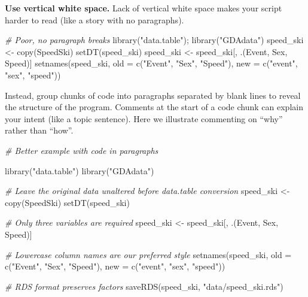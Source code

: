 \documentclass[
]{book}
\newenvironment{Shaded}{\begin{snugshade}}{\end{snugshade}}
\newcommand{\AttributeTok}[1]{\textcolor[rgb]{0.77,0.63,0.00}{#1}}
\newcommand{\CommentTok}[1]{\textcolor[rgb]{0.56,0.35,0.01}{\textit{#1}}}
\newcommand{\FunctionTok}[1]{\textcolor[rgb]{0.00,0.00,0.00}{#1}}
\newcommand{\NormalTok}[1]{#1}
\newcommand{\OtherTok}[1]{\textcolor[rgb]{0.56,0.35,0.01}{#1}}
\newcommand{\StringTok}[1]{\textcolor[rgb]{0.31,0.60,0.02}{#1}}
\begin{document}
\textbf{Use vertical white space.} Lack of vertical white space makes your script harder to read (like a story with no paragraphs).

\begin{Shaded}
\begin{Highlighting}[]
\CommentTok{\# Poor, no paragraph breaks}
\FunctionTok{library}\NormalTok{(}\StringTok{"data.table"}\NormalTok{); }\FunctionTok{library}\NormalTok{(}\StringTok{"GDAdata"}\NormalTok{)}
\NormalTok{speed\_ski }\OtherTok{\textless{}{-}} \FunctionTok{copy}\NormalTok{(SpeedSki)}
\FunctionTok{setDT}\NormalTok{(speed\_ski)}
\NormalTok{speed\_ski }\OtherTok{\textless{}{-}}\NormalTok{ speed\_ski[, .(Event, Sex, Speed)]}
\FunctionTok{setnames}\NormalTok{(speed\_ski, }\AttributeTok{old =} \FunctionTok{c}\NormalTok{(}\StringTok{"Event"}\NormalTok{, }\StringTok{"Sex"}\NormalTok{, }\StringTok{"Speed"}\NormalTok{), }\AttributeTok{new =} \FunctionTok{c}\NormalTok{(}\StringTok{"event"}\NormalTok{, }\StringTok{"sex"}\NormalTok{, }\StringTok{"speed"}\NormalTok{))}
\end{Highlighting}
\end{Shaded}

Instead, group chunks of code into paragraphs separated by blank lines to reveal the structure of the program. Comments at the start of a code chunk can explain your intent (like a topic sentence). Here we illustrate commenting on ``why'' rather than ``how''.

\begin{Shaded}
\begin{Highlighting}[]
\CommentTok{\# Better example with code in paragraphs}

\FunctionTok{library}\NormalTok{(}\StringTok{"data.table"}\NormalTok{)}
\FunctionTok{library}\NormalTok{(}\StringTok{"GDAdata"}\NormalTok{)}

\CommentTok{\# Leave the original data unaltered before data.table conversion }
\NormalTok{speed\_ski }\OtherTok{\textless{}{-}} \FunctionTok{copy}\NormalTok{(SpeedSki)}
\FunctionTok{setDT}\NormalTok{(speed\_ski)}

\CommentTok{\# Only three variables are required }
\NormalTok{speed\_ski }\OtherTok{\textless{}{-}}\NormalTok{ speed\_ski[, .(Event, Sex, Speed)]}

\CommentTok{\# Lowercase column names are our preferred style }
\FunctionTok{setnames}\NormalTok{(speed\_ski, }
         \AttributeTok{old =} \FunctionTok{c}\NormalTok{(}\StringTok{"Event"}\NormalTok{, }\StringTok{"Sex"}\NormalTok{, }\StringTok{"Speed"}\NormalTok{), }
         \AttributeTok{new =} \FunctionTok{c}\NormalTok{(}\StringTok{"event"}\NormalTok{, }\StringTok{"sex"}\NormalTok{, }\StringTok{"speed"}\NormalTok{))}

\CommentTok{\# RDS format preserves factors}
\FunctionTok{saveRDS}\NormalTok{(speed\_ski, }\StringTok{"data/speed\_ski.rds"}\NormalTok{)}
\end{Highlighting}
\end{Shaded}
\end{document}
